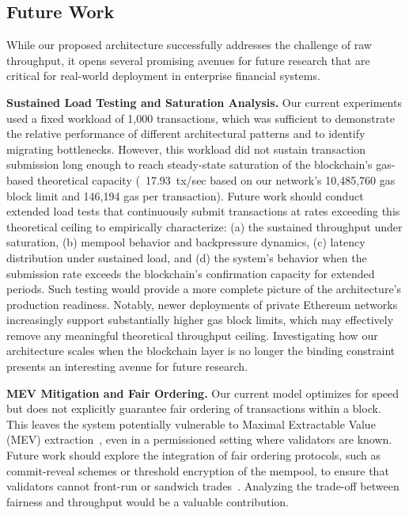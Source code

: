 \subsection{Future Work}

While our proposed architecture successfully addresses the challenge of raw throughput, it opens several promising avenues for future research that are critical for real-world deployment in enterprise financial systems.

\textbf{Sustained Load Testing and Saturation Analysis.} Our current experiments used a fixed workload of 1,000 transactions, which was sufficient to demonstrate the relative performance of different architectural patterns and to identify migrating bottlenecks. However, this workload did not sustain transaction submission long enough to reach steady-state saturation of the blockchain's gas-based theoretical capacity (~17.93~tx/sec based on our network's 10,485,760 gas block limit and 146,194 gas per transaction). Future work should conduct extended load tests that continuously submit transactions at rates exceeding this theoretical ceiling to empirically characterize: (a) the sustained throughput under saturation, (b) mempool behavior and backpressure dynamics, (c) latency distribution under sustained load, and (d) the system's behavior when the submission rate exceeds the blockchain's confirmation capacity for extended periods. Such testing would provide a more complete picture of the architecture's production readiness. Notably, newer deployments of private Ethereum networks increasingly support substantially higher gas block limits, which may effectively remove any meaningful theoretical throughput ceiling. Investigating how our architecture scales when the blockchain layer is no longer the binding constraint presents an interesting avenue for future research.

\textbf{MEV Mitigation and Fair Ordering.} Our current model optimizes for speed but does not explicitly guarantee fair ordering of transactions within a block. This leaves the system potentially vulnerable to Maximal Extractable Value (MEV) extraction~\cite{qin2022mev}, even in a permissioned setting where validators are known. Future work should explore the integration of fair ordering protocols, such as commit-reveal schemes or threshold encryption of the mempool, to ensure that validators cannot front-run or sandwich trades~\cite{grimmelmann2024mev}. Analyzing the trade-off between fairness and throughput would be a valuable contribution.

